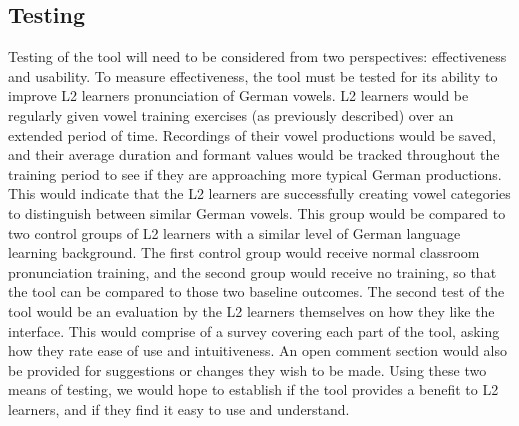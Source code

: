 \subsection{Testing}
Testing of the tool will need to be considered from two perspectives: effectiveness and usability. To measure effectiveness, the tool must be tested for its ability to improve L2 learners pronunciation of German vowels. L2 learners would be regularly given vowel training exercises (as previously described) over an extended period of time. Recordings of their vowel productions would be saved, and their average duration and formant values would be tracked throughout the training period to see if they are approaching more typical German productions. This would indicate that the L2 learners are successfully creating vowel categories to distinguish between similar German vowels. This group would be compared to two control groups of L2 learners with a similar level of German language learning background. The first control group would receive normal classroom pronunciation training, and the second group would receive no training, so that the tool can be compared to those two baseline outcomes. The second test of the tool would be an evaluation by the L2 learners themselves on how they like the interface. This would comprise of a survey covering each part of the tool, asking how they rate ease of use and intuitiveness. An open comment section would also be provided for suggestions or changes they wish to be made. Using these two means of testing, we would hope to establish if the tool provides a benefit to L2 learners, and if they find it easy to use and understand. 


